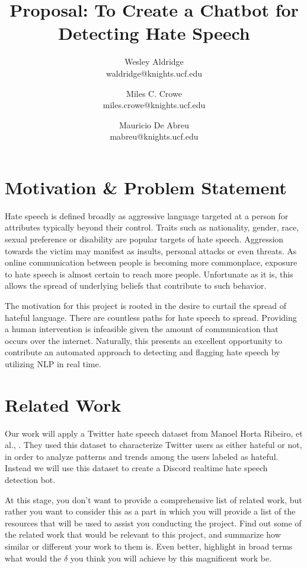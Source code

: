 \documentclass[conference]{sig-alternate-05-2015}
\begin{document}
\title{Proposal: To Create a Chatbot for Detecting Hate Speech}

\author{Wesley Aldridge\\ waldridge@knights.ucf.edu \and Miles C. Crowe  \\ miles.crowe@knights.ucf.edu \and Mauricio De Abreu\\ mabreu@knights.ucf.edu}

\maketitle


\section{Motivation \& Problem Statement}\label{sec:motivation}
Hate speech is defined broadly as aggressive language targeted at a person for attributes typically beyond their control.  Traits such as nationality, gender, race, sexual preference or disability are popular targets of hate speech\cite{Dictionary.com}.  Aggression towards the victim may manifest as insults, personal attacks or even threats.  As online communication between people is becoming more commonplace, exposure to hate speech is almost certain to reach more people.  Unfortunate as it is, this allows the spread of underlying beliefs that contribute to such behavior.

The motivation for this project is rooted in the desire to curtail the spread of hateful language.  There are countless paths for hate speech to spread.  Providing a human intervention is infeasible given the amount of communication  that occurs over the internet.  Naturally, this presents an excellent opportunity to contribute an automated approach to detecting and flagging hate speech by utilizing NLP in real time.

\section{Related Work}\label{sec:related}
Our work will apply a Twitter hate speech dataset from Manoel Horta Ribeiro, et al., \cite{HatefulUsersTwitter}\cite{ribeiro2017like}. They used this dataset to characterize Twitter users as either hateful or not, in order to analyze patterns and trends among the users labeled as hateful. Instead we will use this dataset to create a Discord realtime hate speech detection bot.

\color{red}At this stage, you don't want to provide a comprehensive list of related work, but rather you want to consider this as a part in which you will provide a list of the resources that will be used to assist you conducting the project. Find out some of the related work that would be relevant to this project, and summarize how similar or different your work to them is. Even better, highlight in broad terms what would the $\delta$ you think you will achieve by this magnificent work be. 
\color{black}
\end{document}
